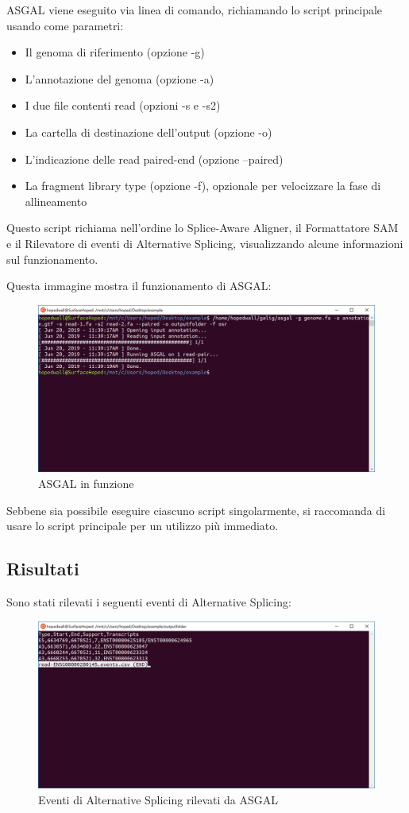 ASGAL viene eseguito via linea di comando, richiamando lo script principale usando come parametri:

\begin{itemize}
	\item Il genoma di riferimento (opzione -g)
	\item L'annotazione del genoma (opzione -a)
	\item I due file contenti read (opzioni -s e -s2)
	\item La cartella di destinazione dell'output (opzione -o)
	\item L'indicazione delle read paired-end (opzione --paired)
	\item La fragment library type (opzione -f), opzionale per velocizzare la fase di allineamento
\end{itemize}

Questo script richiama nell'ordine lo Splice-Aware Aligner, il Formattatore SAM e il Rilevatore di eventi di Alternative Splicing, visualizzando alcune informazioni sul funzionamento.

Questa immagine mostra il funzionamento di ASGAL:

\begin{figure}[h]
	\centering
	\includegraphics[width=\linewidth]{images/prompt.png}
  \caption{ASGAL in funzione}
  \label{fig:Parameters}
\end{figure}

Sebbene sia possibile eseguire ciascuno script singolarmente, si raccomanda di usare lo script principale per un utilizzo più immediato. 

\newpage

\subsection{Risultati}

Sono stati rilevati i seguenti eventi di Alternative Splicing:

\begin{figure}[h]
	\centering
	\includegraphics[width=\linewidth]{images/results.png}
  \caption{Eventi di Alternative Splicing rilevati da ASGAL}
  \label{fig:Parameters}
\end{figure}

\newpage